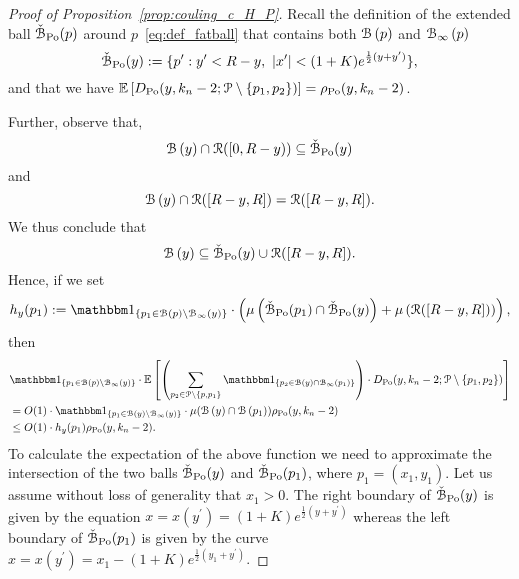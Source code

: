 \begin{proof}[Proof of Proposition~\ref{prop:couling_c_H_P}]
Recall the definition of the extended ball $\check{{\mathcal B}}_{{\mathrm{Po}}}(p)$ around $p$~\eqref{eq:def_fatball} that contains both ${\mathcal B}\left(p\right)$ and ${\mathcal B}_{\infty}\left(p\right)$ 
\[
	\check{{\mathcal B}}_{{\mathrm{Po}}}(y) : = \{ p^\prime : y^\prime < R - y, \ |x^\prime| < (1+K) e^{\frac{1}{2} (y + y^\prime)}  \},
\]
and that we have $\mathbb{E}\left[D_{{\mathrm{Po}}} (y,k_n-2;{\mathcal P} \setminus \{ p_1,p_2\})\right] = \rho_{{\mathrm{Po}}}(y,k_n-2)$.

Further, observe that,
\begin{equation*} %
\BallHyp{y} \cap \Rcal ([0,R-y)) \subseteq \FatBallHyp{y}
\end{equation*}
and 
\begin{equation*} %
\BallHyp{y} \cap \Rcal ([R-y,R]) = \Rcal ([R-y,R]).
\end{equation*}
We thus conclude that 
\begin{equation} \label{eq:ball_inclusions}
{\mathcal B}\left(y\right) \subseteq \check{{\mathcal B}}_{{\mathrm{Po}}}(y) \cup {\mathcal R}([R-y,R]).
\end{equation}
Hence, if we set 
\[
h_y(p_1) := \ind{p_1 \in \BallHyp{p}\setminus \BallPo{y}} \cdot    
\left( \mu \left( \FatBallHyp{p_1} \cap \FatBallHyp{y} \right)
+ \mu \left( \Rcal([R-y,R]) \right) \right),
\]
then 
\begin{align*}
&\ind{p_1\in \BallHyp{p}\setminus \BallPo{y}} \cdot \Exp{ \left(\sum_{p_2 \in \Pcal \setminus 
\{p,p_1\}} \ind{p_2 \in \BallHyp{y} \cap \BallPo{p_1}}\right) \cdot 
D_{\Po} (y,k_n-2;\Pcal \setminus \{ p_1, p_2\})
} \\
&=O(1)\cdot
\ind{p_1\in \BallHyp{y}\setminus \BallPo{y}} \cdot \mu (\BallHyp{y}\cap \BallHyp{p_1}) \rho_{\Po}(y,k_n-2) \\
& \leq O(1) \cdot  h_y (p_1) \rho_{\Po}(y,k_n-2) . 
\end{align*}
To calculate the expectation of the above function we need to approximate the 
intersection of the two balls $\check{{\mathcal B}}_{{\mathrm{Po}}}(y)$ and $\check{{\mathcal B}}_{{\mathrm{Po}}}(p_1)$, 
where $p_1= (x_1,y_1)$. 
Let us assume without loss of generality that $x_1 > 0$. 
The right boundary of $\check{{\mathcal B}}_{{\mathrm{Po}}}(y)$ is given by the equation 
$x = x(y^\prime) = (1+K)e^{\frac{1}{2} (y + y^\prime)}$ whereas the left boundary of $\check{{\mathcal B}}_{{\mathrm{Po}}}(p_1)$ is given by the curve $x = x(y^\prime)= x_1 - (1+ K)e^{\frac{1}{2} (y_1 + y^\prime)}.$ 


\end{proof}
